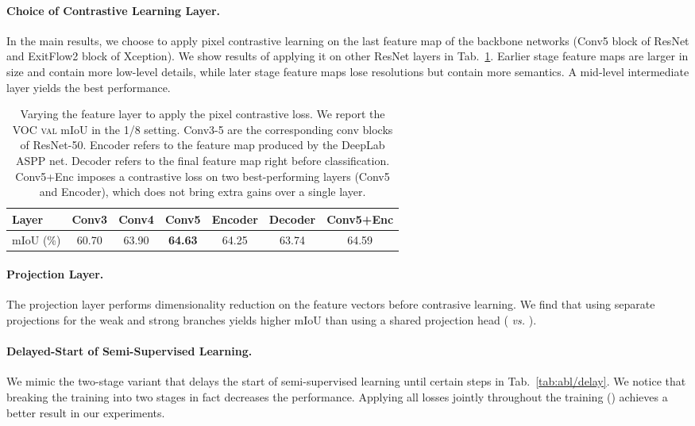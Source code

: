 \paragraph{Choice of Contrastive Learning Layer.}
In the main results, we choose to apply pixel contrastive learning on the last feature map of the backbone networks (Conv5 block of ResNet and ExitFlow2 block of Xception). We show results of applying it on other ResNet layers in Tab.~\ref{tab:abl/layer}. Earlier stage feature maps are larger in size and contain more low-level details, while later stage feature maps lose resolutions but contain more semantics. A mid-level intermediate layer yields the best performance.

\begin{table}[tb]
    \small
    \centering
    \caption{Varying the feature layer to apply the pixel contrastive loss. We report the VOC \textsc{val} mIoU in the 1/8 setting. Conv3-5 are the corresponding conv blocks of ResNet-50. Encoder refers to the feature map produced by the DeepLab ASPP net. Decoder refers to the final feature map right before classification. Conv5+Enc imposes a contrastive loss on two best-performing layers (Conv5 and Encoder), which does not bring extra gains over a single layer.}
    \label{tab:abl/layer}
    \vspace{-5pt}
    \setlength{\tabcolsep}{1.9pt}
    \begin{tabular}{lcccccc}
    \toprule
        Layer  & Conv3 & Conv4 & Conv5 & Encoder & Decoder & Conv5+Enc \\
    \midrule
    mIoU (\%)  &  60.70 & 63.90 & \textbf{64.63} & 64.25  & 63.74  & 64.59  \\
    \bottomrule
    \end{tabular}
    \vspace{-5pt}
\end{table}


\paragraph{Projection Layer.}
The projection layer performs dimensionality reduction on the feature vectors before contrasive learning. We find that using separate projections for the weak and strong branches yields higher mIoU than using a shared projection head ( \emph{vs.} ).


\paragraph{Delayed-Start of Semi-Supervised Learning.}
We mimic the two-stage variant that delays the start of semi-supervised learning until certain steps in Tab.~\ref{tab:abl/delay}. We notice that breaking the training into two stages in fact decreases the performance. Applying all losses jointly throughout the training () achieves a better result in our experiments.

